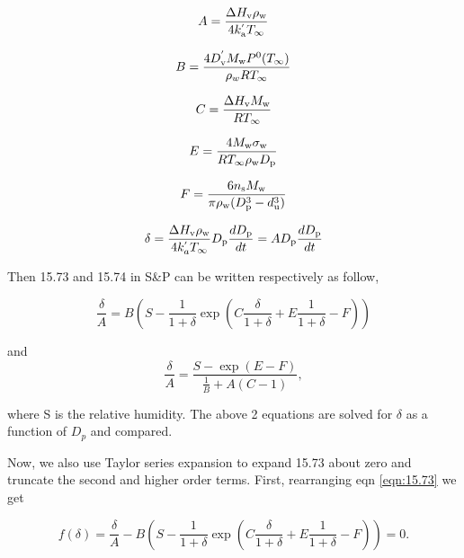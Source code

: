 \documentclass[12pt]{article}
\begin{document}
\begin{equation}
A=\frac{\Delta H_{\rm v} \rho_{\rm w}}{4 k_{\rm a}^{'} T_{\infty}}
\end{equation}

\begin{equation}
B=\frac{4 D_{\rm v}^{'} M_{\rm w} P^{\rm 0}(T_{\infty})}{\rho_w R T_{\infty}}
\end{equation}

\begin{equation}
C=\frac{\Delta H_{\rm v} M_{\rm w}}{R T_{\infty}}
\end{equation}

\begin{equation}
E=\frac{4 M_{\rm w}\sigma_{\rm w}}{R T_{\infty} \rho_{\rm w} D_{\rm p}}
\end{equation}

\begin{equation}
F=\frac{6 n_{\rm s} M_{\rm w}}{\pi \rho_{\rm w} (D_{\rm p}^{3}-d_{\rm u}^{3})}
\end{equation}

\begin{equation}\label{eqn:23}
\delta=\frac{\Delta H_{\rm v} \rho_{\rm w}}{4 k_a^{'} T_{\infty}} D_{\rm p} \frac{d D_{\rm p}}{dt}=A D_{\rm p} \frac{d D_{\rm p}}{dt}
\end{equation}

Then 15.73 and 15.74 in S\&P can be written respectively as follow,

\begin{equation}\label{eqn:15.73}
\frac{\delta}{A}=B(S-\frac{1}{1+\delta}\exp(C\frac{\delta}{1+\delta}+E \frac{1}{1+\delta}-F))
\end{equation}

and 
\begin{equation}\label{eqn:15.74}
\frac{\delta}{A}=\frac{S-\exp(E-F)}{\frac{1}{B}+A(C-1)},
\end{equation}

where S is the relative humidity. The above 2 equations are solved for $\delta$ as a function of $D_{p}$ and compared. 

Now, we also use Taylor series expansion to expand 15.73 about zero and truncate the second and higher order terms. First, rearranging  eqn \ref{eqn:15.73} we get


\begin{equation}\label{eqn:26}
f(\delta)=\frac{\delta}{A}-B(S-\frac{1}{1+\delta}\exp(C\frac{\delta}{1+\delta}+E \frac{1}{1+\delta}-F))=0.
\end{equation}
\end{document}
